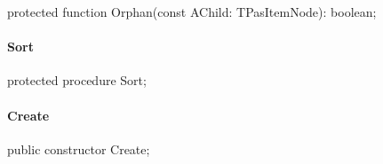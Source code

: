 \documentclass{report}
\newif\ifpdf
\begin{document}
\label{PasDoc_HierarchyTree.TPasItemNode-Orphan}
\begin{list}{}{
\setlength{\itemindent}{0cm}
\setlength{\listparindent}{0cm}
\setlength{\leftmargin}{\evensidemargin}
\addtolength{\leftmargin}{\tmplength}
\settowidth{\labelsep}{X}
\addtolength{\leftmargin}{\labelsep}
\setlength{\labelwidth}{\tmplength}
}
\item[\textbf{Declaration}\hfill]
\ifpdf
\begin{flushleft}
\fi
\begin{ttfamily}
protected function Orphan(const AChild: TPasItemNode): boolean;\end{ttfamily}

\ifpdf
\end{flushleft}
\fi

\end{list}
\paragraph*{Sort}\hspace*{\fill}

\label{PasDoc_HierarchyTree.TPasItemNode-Sort}
\begin{list}{}{
\setlength{\itemindent}{0cm}
\setlength{\listparindent}{0cm}
\setlength{\leftmargin}{\evensidemargin}
\addtolength{\leftmargin}{\tmplength}
\settowidth{\labelsep}{X}
\addtolength{\leftmargin}{\labelsep}
\setlength{\labelwidth}{\tmplength}
}
\item[\textbf{Declaration}\hfill]
\ifpdf
\begin{flushleft}
\fi
\begin{ttfamily}
protected procedure Sort;\end{ttfamily}

\ifpdf
\end{flushleft}
\fi

\end{list}
\paragraph*{Create}\hspace*{\fill}

\label{PasDoc_HierarchyTree.TPasItemNode-Create}
\begin{list}{}{
\setlength{\itemindent}{0cm}
\setlength{\listparindent}{0cm}
\setlength{\leftmargin}{\evensidemargin}
\addtolength{\leftmargin}{\tmplength}
\settowidth{\labelsep}{X}
\addtolength{\leftmargin}{\labelsep}
\setlength{\labelwidth}{\tmplength}
}
\item[\textbf{Declaration}\hfill]
\ifpdf
\begin{flushleft}
\fi
\begin{ttfamily}
public constructor Create;\end{ttfamily}

\ifpdf
\end{flushleft}
\fi

\end{list}
\end{document}
